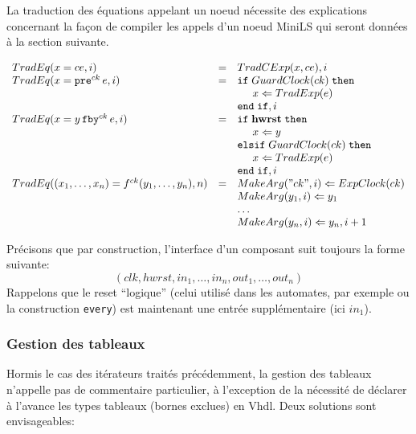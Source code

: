 \documentclass[a4paper]{article}
\newcommand{\minils}{{\sc MiniLS}}
\newcommand{\vhdl}{{\sc Vhdl}}
\newcommand{\mybox}[1]{\mbox{\tt{#1}}}
\newcommand{\ind}[0]{\hspace{0.5cm}}
\newcommand{\Fby}[2]{#1 \, \mybox{fby}^{ck} \, #2}
\newcommand{\Pre}[1]{\mybox{pre}^{ck} \, #1}
\newcommand{\App}[2]{#1^{ck}(#2)}
\newcommand{\Assign}[2]{#1 \Leftarrow #2}
\begin{document}
La traduction des \'equations appelant un noeud n\'ecessite des
explications concernant la fa\c{c}on de compiler les appels d'un noeud
\minils{} qui seront donn\'ees \`a la section suivante.

\newcommand{\TradEq}[2]{TradEq(#1,#2)}
\newcommand{\MA}[2]{MakeArg(#1,#2)}

\[
\begin{array}{lcl}
  \TradEq{x = ce}{i} & = & \TradCE{x}{ce}, i \\

  \TradEq{x = \Pre{e}}{i} & = & \mathtt{if} \; \GEC{ck} \; \mathtt{then} \\
  & & \ind \Assign{x}{\TradE{e}} \\
  & & \mathtt{end} \; \mathtt{if}, i \\

  \TradEq{x = \Fby{y}{e}}{i} & = & \mathtt{if} \; \mathbf{hwrst}
  \; \mathtt{then} \\
  & & \ind \Assign{x}{y} \\
  & & \mathtt{elsif} \; \GEC{ck} \; \mathtt{then} \\
  & & \ind \Assign{x}{\TradE{e}} \\
  & & \mathtt{end} \; \mathtt{if}, i \\


  \TradEq{(x_1,\dots,x_n) = \App{f}{y_1,\dots,y_n}}{n} & = &
  \Assign{\MA{"ck"}{i}}{\EC{ck}} \\
  & & \Assign{\MA{y_1}{i}}{y_1} \\
  & & \dots \\
  & & \Assign{\MA{y_n}{i}}{y_n}, i + 1 \\
\end{array}
\]

Pr\'ecisons que par construction, l'interface d'un composant suit toujours la
forme suivante:
\[(clk, hwrst, in_1, \dots,in_n, out_1,\dots,out_n)
\]
Rappelons que le reset ``logique'' (celui utilis\'e dans les automates,
par exemple ou la construction \verb-every-) est maintenant une entr\'ee
suppl\'ementaire (ici $in_1$).

\subsubsection{Gestion des tableaux}

Hormis le cas des it\'erateurs trait\'es pr\'ec\'edemment, la gestion des
tableaux n'appelle pas de commentaire particulier, \`a l'exception de la
n\'ecessit\'e de d\'eclarer \`a l'avance les types tableaux (bornes exclues) en
\vhdl{}. Deux solutions sont envisageables:
\end{document}
